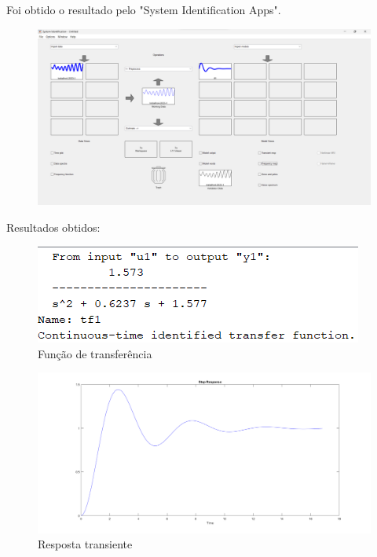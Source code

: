 \documentclass[10pt]{article}
\begin{document}
\quad Foi obtido o resultado pelo "System Identification Apps".

\begin{figure}[h]
    \centering
    \includegraphics[scale=0.24]{si5.png}
    
\end{figure}

\newpage

\quad Resultados obtidos:

\begin{figure}[h]
    \centering
    \includegraphics[scale=0.7]{si6.png}
    \caption{Função de transferência}
\end{figure}

\begin{figure}[h]
    \centering
    \includegraphics[scale=0.24]{si3.png}
    \caption{Resposta transiente}
\end{figure}
\end{document}
